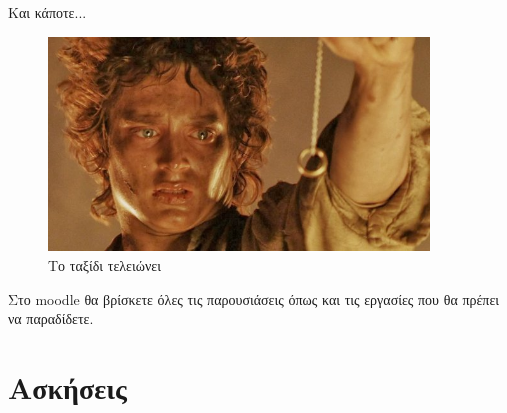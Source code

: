 \documentclass[greek]{beamer}
\begin{document}
\begin{frame}{Και κάποτε...}
      \begin{figure}
            \centering
            \includegraphics[width=0.9\textwidth]{"images/frodo2"}
            \caption{Το ταξίδι τελειώνει}
      \end{figure}
\end{frame}

\begin{frame}
      Στο moodle θα βρίσκετε όλες τις παρουσιάσεις όπως και τις εργασίες που θα πρέπει να παραδίδετε.
\end{frame}

\section{Ασκήσεις}
\end{document}
